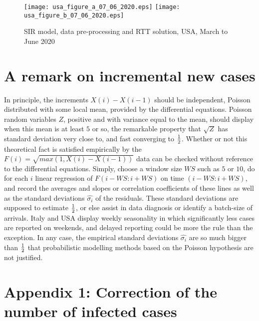 \documentclass{article}
\begin{document}
{\begin{figure}
\begin{center}
{\texttt{[image: usa\_figure\_a\_07\_06\_2020.eps]}}
\qquad
{\texttt{[image: usa\_figure\_b\_07\_06\_2020.eps]}}
\end{center}
\begin{center}
\caption{SIR model, data pre-processing and RTT solution, USA, March to June 2020
}
\label{fig:usa_sir_model_07_06_2020}
\end{center}
\end{figure}



\section{A remark on incremental new cases} \label{More}

In principle, the increments $X(i)-X(i-1)$ should be independent, Poisson distributed with some local mean, provided by the differential equations. Poisson random variables $Z$, positive and with variance equal to the mean, should display when this mean is at least $5$ or so, the remarkable property that $\sqrt{Z}$ has standard deviation very close to, and fast converging to ${1 \over 2}$. Whether or not this theoretical fact is satisfied empirically by the $F(i)=\sqrt{max(1,X(i)-X(i-1))}$ data can be checked without reference to the differential equations. Simply, choose a window size $WS$ such as $5$ or $10$, do for each $i$ linear regression of $F(i-WS:i+WS)$ on time $(i-WS:i+WS)$, and record the averages and slopes or correlation coefficients of these lines as well as the standard deviations $\hat{\sigma_i}$ of the residuals. These standard deviations are supposed to estimate ${1 \over 2}$, or else assist in data diagnosis or identify a batch-size of arrivals. Italy and USA display weekly seasonality in which significantly less cases are reported on weekends, and delayed reporting could be more the rule than the exception. In any case, the empirical standard deviations $\hat{\sigma_i}$ are so much bigger than ${1 \over 2}$ that probabilistic modelling methods based on the Poisson hypothesis are not justified.


\section{Appendix 1: Correction of the number of infected cases}

}
\end{document}
